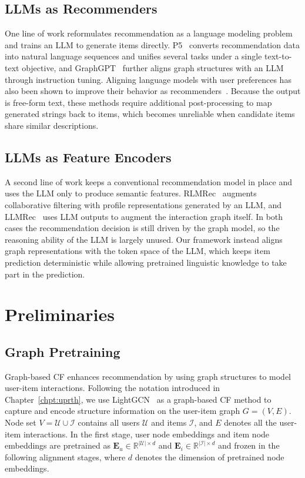 \subsection{LLMs as Recommenders}
One line of work reformulates recommendation as a language modeling problem and trains an LLM to generate items directly. P5~\cite{p5} converts recommendation data into natural language sequences and unifies several tasks under a single text-to-text objective, and GraphGPT~\cite{graphgpt} further aligns graph structures with an LLM through instruction tuning. Aligning language models with user preferences has also been shown to improve their behavior as recommenders~\cite{cao-etal-2024-aligning}. Because the output is free-form text, these methods require additional post-processing to map generated strings back to items, which becomes unreliable when candidate items share similar descriptions.

\subsection{LLMs as Feature Encoders}
A second line of work keeps a conventional recommendation model in place and uses the LLM only to produce semantic features. RLMRec~\cite{rlmrec} augments collaborative filtering with profile representations generated by an LLM, and LLMRec~\cite{llmrec} uses LLM outputs to augment the interaction graph itself. In both cases the recommendation decision is still driven by the graph model, so the reasoning ability of the LLM is largely unused. Our framework instead aligns graph representations with the token space of the LLM, which keeps item prediction deterministic while allowing pretrained linguistic knowledge to take part in the prediction.

\section{Preliminaries}\label{sec:pre}
\subsection{Graph Pretraining}
Graph-based CF enhances recommendation by using graph structures to model user-item interactions. Following the notation introduced in Chapter~\ref{chpt:uprth}, we use LightGCN~\cite{LightGCN} as a graph-based CF method to capture and encode structure information on the user-item graph $G = (V,E)$. Node set $V=\mathcal{U}\cup\mathcal{I}$ contains all users $\mathcal{U}$ and items $\mathcal{I}$, and $E$ denotes all the user-item interactions. In the first stage, user node embeddings and item node embeddings are pretrained as $\mathbf{E}_u\in\mathbb{R}^{|\mathcal{U}|\times d}$ and $\mathbf{E}_i\in\mathbb{R}^{|\mathcal{I}|\times d}$ and frozen in the following alignment stages, where $d$ denotes the dimension of pretrained node embeddings.


